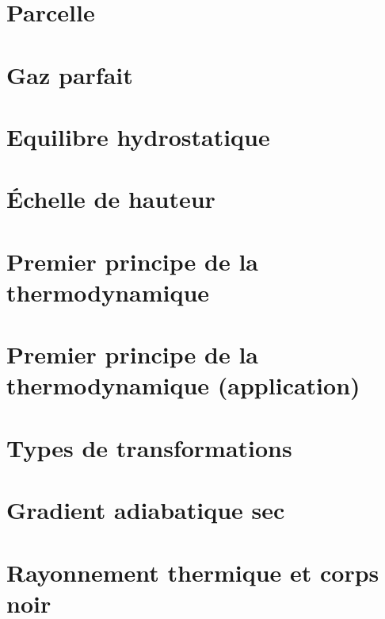 \documentclass[a4paper,DIV16,10pt]{scrartcl}
\begin{document}
 \inidoc

\section{Parcelle}




\newpage
\section{Gaz parfait}


\newpage
\section{Equilibre hydrostatique}


\newpage
\section{\'Echelle de hauteur}


\newpage
\section{Premier principe de la thermodynamique}


\newpage
\section{Premier principe de la thermodynamique (application)}


\newpage
\section{Types de transformations}



\newpage
\section{Gradient adiabatique sec}


\newpage
\section{Rayonnement thermique et corps noir}


\end{document}
